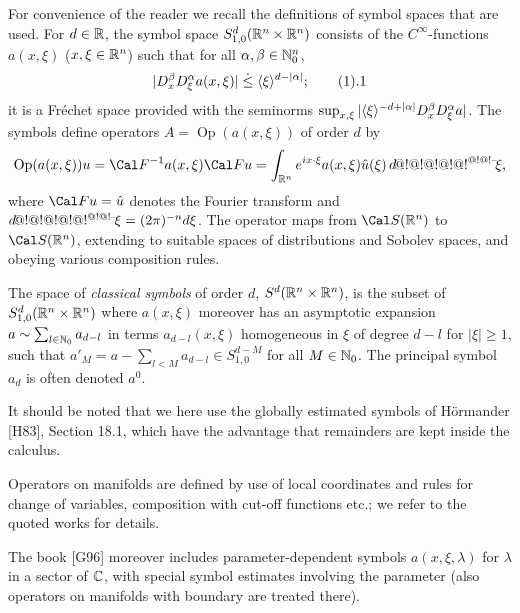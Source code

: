 For convenience of the reader we recall the definitions of symbol spaces that are used.
For $d\in{\Bbb R}$, the symbol space $S^d_{1,0}({\Bbb R}^n\times{\Bbb
R}^n)$ consists of the $C^\infty $-functions $a(x,\xi )$ ($x,\xi
\in{\Bbb R}^n$) such that for all $\alpha ,\beta \in{\Bbb N}_0^n$,
$$
|D_x^\beta D_\xi ^\alpha a(x,\xi )|\leg \ang\xi ^{d-|\alpha |};\tag1.1
$$
it is a Fr\'echet space provided with the seminorms $\sup_{x,\xi
}|\langle {\xi} \rangle ^{-d+|\alpha |}D_x^\beta D_\xi ^\alpha a|$. The symbols
define operators $A=\operatorname{Op}(a(x,\xi ))$ of order $d$ by
$$
\operatorname{Op}(a(x,\xi ))u= \Cal F ^{-1}
a(x,\xi)\Cal Fu=\int_{\Bbb
R^n}e^{ix\cdot\xi }a(x,\xi )\hat u(\xi )\, \d\xi,
$$
where $\Cal F u=\hat u$ denotes the Fourier transform and $d\!@!@!@!@!@!{}^{@!@!\text{\rm--}}\!\xi =(2\pi )^{-n}d\xi $. The operator maps from
$\Cal S({\Bbb R}^n)$ to $\Cal S({\Bbb R}^n)$, extending to suitable
spaces of distributions and Sobolev spaces, and obeying various
composition rules.

The space of {\it classical symbols} of order $d$, $S^d({\Bbb R}^n\times{\Bbb
R}^n)$, is the subset of $S^d_{1,0}({\Bbb R}^n\times{\Bbb
R}^n)$ where $a(x,\xi )$ moreover has an asymptotic expansion
$a\sim \sum_{l\in{\Bbb N}_0}a_{d-l}$ in terms $a_{d-l}(x,\xi )$
homogeneous in $\xi $ of degree $d-l$ for $|\xi |\ge 1$, such that
$a'_M=a-\sum_{l<M}a_{d-l}\in S^{d-M}_{1,0}$ for all $M\in {\Bbb
N}_0$. The principal symbol $a_d$ is often denoted $a^0$.

It should be noted that we here use the globally estimated symbols of H\"ormander [H83],
Section 18.1, which have the
advantage that remainders are kept inside the calculus.

Operators on manifolds are defined by use of local coordinates and
rules for change of variables, composition with cut-off functions etc.; we refer to the quoted
works for details.


The book [G96] moreover includes parameter-dependent symbols $a(x,\xi
,\lambda )$ for $\lambda $ in a sector of ${\Bbb C}$, with special
symbol estimates involving the parameter (also operators on manifolds
with boundary are treated there).
\medskip

